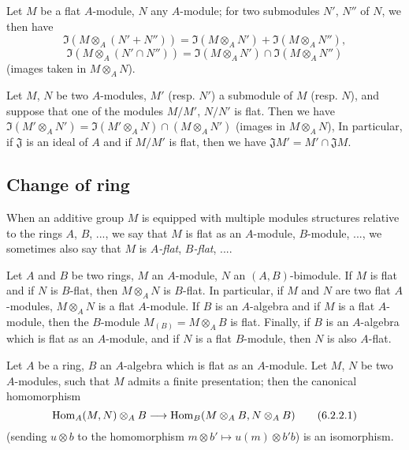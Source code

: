 \begin{env}[6.1.3]
\label{0.6.1.3}
Let $M$ be a flat $A$-module, $N$ any $A$-module; for two submodules $N'$, $N''$
of $N$, we then have
\[
  \Im(M\otimes_A(N'+N''))=\Im(M\otimes_A N')+\Im(M\otimes_A N''),
\]
\[
  \Im(M\otimes_A(N'\cap N''))=\Im(M\otimes_A N')\cap\Im(M\otimes_A N'')
\]
(images taken in $M\otimes_A N$).
\end{env}

\begin{env}[6.1.4]
\label{0.6.1.4}
Let $M$, $N$ be two $A$-modules, $M'$ (resp. $N'$) a submodule of $M$
(resp. $N$), and suppose that one of the modules $M/M'$, $N/N'$ is flat. Then we
have $\Im(M'\otimes_A N')=\Im(M'\otimes_A N)\cap(M\otimes_A N')$ (images in
$M\otimes_A N$), In particular, if $\mathfrak{J}$ is an ideal of $A$ and if
$M/M'$ is flat, then we have $\mathfrak{J}M'=M'\cap\mathfrak{J}M$.
\end{env}

\subsection{Change of ring}
\label{subsection-change-of-ring}

When an additive group $M$ is equipped with multiple modules structures relative
to the rings $A$, $B$, ..., we say that $M$ is flat as an $A$-module,
$B$-module, ..., we sometimes also say that $M$ is {\em $A$-flat},
{\em $B$-flat}, ....

\begin{env}[6.2.1]
\label{0.6.2.1}
Let $A$ and $B$ be two rings, $M$ an $A$-module, $N$ an $(A,B)$-bimodule. If $M$
is flat and if $N$ is $B$-flat, then $M\otimes_A N$ is $B$-flat. In particular,
if $M$ and $N$ are two flat $A$-modules, $M\otimes_A N$ is a flat $A$-module. If
$B$ is an $A$-algebra and if $M$ is
a flat $A$-module, then the $B$-module $M_{(B)}=M\otimes_A B$ is flat. Finally,
if $B$ is an $A$-algebra which is flat as an $A$-module, and if $N$ is a flat
$B$-module, then $N$ is also $A$-flat.
\end{env}

\begin{env}[6.2.2]
\label{0.6.2.2}
Let $A$ be a ring, $B$ an $A$-algebra which is flat as an $A$-module. Let $M$,
$N$ be two $A$-modules, such that $M$ admits a finite presentation; then the
canonical homomorphism
\[
  {\mathop{\mathrm{Hom}}\nolimits}_A(M,N)\otimes_A B\longrightarrow{\mathop{\mathrm{Hom}}\nolimits}_B(M\otimes_A B,N\otimes_A B)
  \tag{6.2.2.1}
\]
(sending $u\otimes b$ to the homomorphism $m\otimes b'\mapsto u(m)\otimes b' b$)
is an isomorphism.
\end{env}

